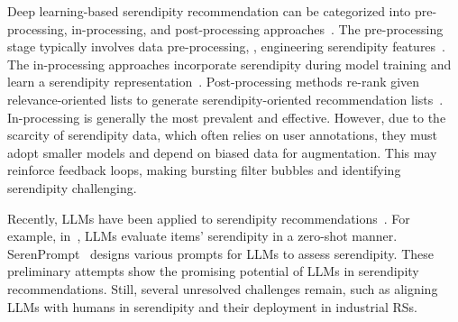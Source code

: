 Deep learning-based serendipity recommendation can be categorized into pre-processing, in-processing, and post-processing approaches~\cite{fu2023deep}. The pre-processing stage typically involves data pre-processing, \eg, engineering serendipity features~\cite{li2019haes,kim2019sequential}. 
The in-processing approaches incorporate serendipity during model training and learn a serendipity representation~\cite{fu2023wisdom,li2020directional,li2020purs,zhang2021snpr,wang2023industrial}.
Post-processing methods re-rank given relevance-oriented lists to generate serendipity-oriented recommendation lists~\cite{cheng2017learning,liu2023personalized}. 
In-processing is generally the most prevalent and effective. However, due to the scarcity of serendipity data, which often relies on user annotations, they must adopt smaller models and depend on biased data for augmentation. This may reinforce feedback loops, making bursting filter bubbles and identifying serendipity challenging.


Recently, LLMs have been applied to serendipity recommendations~\cite{fu2024art,tokutake2024can}. For example, in~\cite{tokutake2024can}, LLMs evaluate items' serendipity in a zero-shot manner. SerenPrompt~\cite{fu2024art} designs various prompts for LLMs to assess serendipity. These preliminary attempts show the promising potential of LLMs in serendipity recommendations. Still, several unresolved challenges remain, such as aligning LLMs with humans in serendipity and their deployment in industrial RSs.


